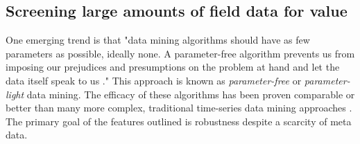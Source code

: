 \subsection{Screening large amounts of field data for value}
\label{sec:screeningdata}

One emerging trend is that "data mining algorithms should have as few parameters as possible, ideally none. A parameter-free algorithm prevents us from imposing our prejudices and presumptions on the problem at hand and let the data itself speak to us \cite{Keogh_2004}." This approach is known as \emph{parameter-free} or \emph{parameter-light} data mining. The efficacy of these algorithms has been proven comparable or better than many more complex, traditional time-series data mining approaches \cite{Keogh_2004}. The primary goal of the features outlined is robustness despite a scarcity of meta data.